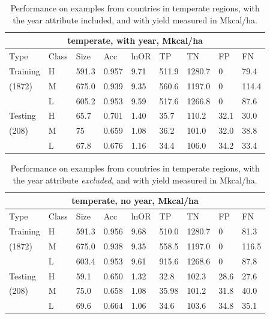 \documentclass[11pt]{article}
\begin{document}
\begin{table}[h!]
\centering
\begin{tabular}{lllllllll}
\toprule
\multicolumn{9}{c}{\textbf{temperate, with year, Mkcal/ha}} \\
\midrule
Type & Class & Size & Acc & lnOR & TP & TN & FP & FN \\
\midrule
Training & H & 591.3 & 0.957 & 9.71 & 511.9 & 1280.7 & 0 & 79.4  \\
(1872) & M & 675.0 & 0.939 & 9.35 & 560.6 & 1197.0 & 0 & 114.4  \\
& L & 605.2 & 0.953 & 9.59 & 517.6 & 1266.8 & 0 & 87.6  \\
Testing & H & 65.7 & 0.701 & 1.40 & 35.7 & 110.2 & 32.1 & 30.0  \\
(208) & M & 75 & 0.659 & 1.08 & 36.2 & 101.0 & 32.0 & 38.8  \\
& L & 67.8 & 0.676 & 1.16 & 34.4 & 106.0 & 34.2 & 33.4  \\
\bottomrule
\end{tabular}
\caption{Performance on examples from countries in temperate regions, with the year attribute included, and with yield measured in Mkcal/ha.}
\label{k.wy.temp_results}
\end{table}

\begin{table}[h!]
\centering
\begin{tabular}{lllllllll}
\toprule
\multicolumn{9}{c}{\textbf{temperate, no year, Mkcal/ha}} \\
\midrule
Type & Class & Size & Acc & lnOR & TP & TN & FP & FN \\
\midrule
Training & H & 591.3 & 0.956 & 9.68 & 510.0 & 1280.7 & 0 & 81.3  \\
(1872) & M & 675.0 & 0.938 & 9.35 & 558.5 & 1197.0 & 0 & 116.5  \\
& L & 603.4 & 0.953 & 9.61 & 915.6 & 1268.6 & 0 & 87.8  \\
Testing & H & 59.1 & 0.650 & 1.32 & 32.8 & 102.3 & 28.6 & 27.6  \\
(208) & M & 75.0 & 0.658 & 1.08 & 35.98 & 101.2 & 31.8 & 40.0  \\
& L & 69.6 & 0.664 & 1.06 & 34.6 & 103.6 & 34.8 & 35.1  \\
\bottomrule
\end{tabular}
\caption{Performance on examples from countries in temperate regions, with the year attribute \emph{excluded}, and with yield measured in Mkcal/ha.}
\label{k.ny.temp_results}
\end{table}
\end{document}
